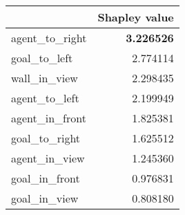 \begin{tabular}{lr}
\toprule
 & Shapley value \\
\midrule
agent\_to\_right & \color{f_darkred} \bfseries 3.226526 \\
goal\_to\_left & 2.774114 \\
wall\_in\_view & 2.298435 \\
agent\_to\_left & 2.199949 \\
agent\_in\_front & 1.825381 \\
goal\_to\_right & 1.625512 \\
agent\_in\_view & 1.245360 \\
goal\_in\_front & 0.976831 \\
goal\_in\_view & 0.808180 \\
\bottomrule
\end{tabular}